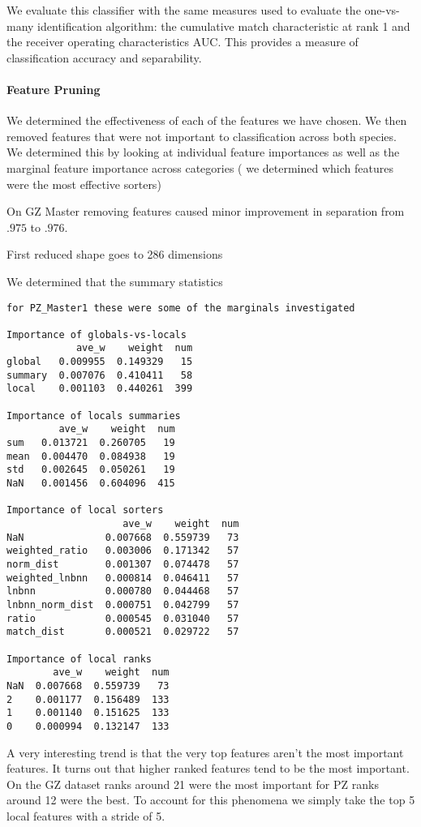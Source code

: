 We evaluate this classifier with the same measures used to evaluate the
  one-vs-many identification algorithm:
the cumulative match characteristic at rank 1 and the receiver operating
  characteristics AUC{}.
This provides a measure of classification accuracy and separability.

\paragraph{Feature Pruning}
We determined the effectiveness of each of the features we have chosen.  We
then removed features that were not important to classification across both
species. We determined this by looking at individual feature importances as
well as the marginal feature importance across categories (\eg{} we determined
which features were the most effective sorters)

On GZ Master removing features caused minor improvement in separation from
$.975$ to $.976$.

First reduced shape goes to 286 dimensions

We determined that the summary statistics 
\begin{verbatim}
for PZ_Master1 these were some of the marginals investigated

Importance of globals-vs-locals
            ave_w    weight  num
global   0.009955  0.149329   15
summary  0.007076  0.410411   58
local    0.001103  0.440261  399

Importance of locals summaries
         ave_w    weight  num
sum   0.013721  0.260705   19
mean  0.004470  0.084938   19
std   0.002645  0.050261   19
NaN   0.001456  0.604096  415

Importance of local sorters
                    ave_w    weight  num
NaN              0.007668  0.559739   73
weighted_ratio   0.003006  0.171342   57
norm_dist        0.001307  0.074478   57
weighted_lnbnn   0.000814  0.046411   57
lnbnn            0.000780  0.044468   57
lnbnn_norm_dist  0.000751  0.042799   57
ratio            0.000545  0.031040   57
match_dist       0.000521  0.029722   57

Importance of local ranks
        ave_w    weight  num
NaN  0.007668  0.559739   73
2    0.001177  0.156489  133
1    0.001140  0.151625  133
0    0.000994  0.132147  133
\end{verbatim}


A very interesting trend is that the very top features aren't the most
important features.  It turns out that higher ranked features tend to be the
most important.  On the GZ dataset ranks around 21 were the most important for
PZ ranks around 12 were the best. To account for this phenomena we simply take
the top 5 local features with a stride of 5.


